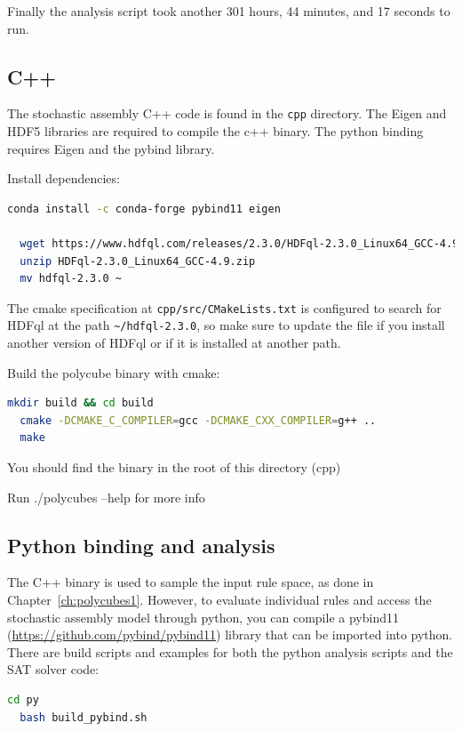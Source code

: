 Finally the analysis script took another 301 hours, 44 minutes, and 17 seconds to run.


\subsection{C++}
The stochastic assembly C++ code is found in the \texttt{cpp} directory. The Eigen and HDF5 libraries are required to compile the c++ binary. The python binding requires Eigen and the pybind library.

Install dependencies:
\begin{lstlisting}[language=bash]
  conda install -c conda-forge pybind11 eigen

  wget https://www.hdfql.com/releases/2.3.0/HDFql-2.3.0_Linux64_GCC-4.9.zip
  unzip HDFql-2.3.0_Linux64_GCC-4.9.zip
  mv hdfql-2.3.0 ~
\end{lstlisting}

The cmake specification at \texttt{cpp/src/CMakeLists.txt} is configured to search for HDFql at the path \texttt{\textasciitilde/hdfql-2.3.0}, so make sure to update the file if you install another version of HDFql or if it is installed at another path.

Build the polycube binary with cmake:
\begin{lstlisting}[language=bash]
  mkdir build && cd build
  cmake -DCMAKE_C_COMPILER=gcc -DCMAKE_CXX_COMPILER=g++ ..
  make
\end{lstlisting}

You should find the binary in the root of this directory (cpp)

Run ./polycubes --help for more info

\subsection{Python binding and analysis}
The C++ binary is used to sample the input rule space, as done in Chapter~\ref{ch:polycubes1}. However, to evaluate individual rules and access the stochastic assembly model through python, you can compile a pybind11 (\url{https://github.com/pybind/pybind11}) library that can be imported into python. There are build scripts and examples for both the python analysis scripts and the SAT solver code:

\begin{lstlisting}[language=bash]
  cd py
  bash build_pybind.sh
\end{lstlisting}

